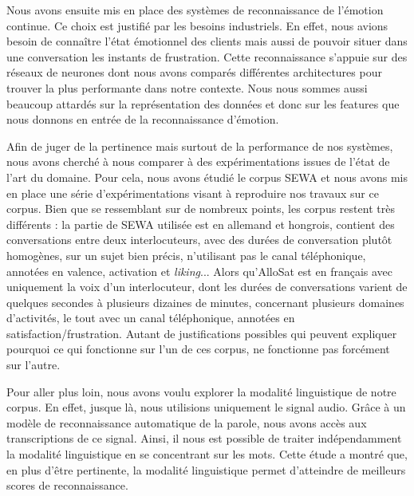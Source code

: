 Nous avons ensuite mis en place des systèmes de reconnaissance de l'émotion continue. Ce choix est justifié par les besoins industriels. En effet, nous avions besoin de connaître l'état émotionnel des clients mais aussi de pouvoir situer dans une conversation les instants de frustration. Cette reconnaissance s'appuie sur des réseaux de neurones dont nous avons comparés différentes architectures pour trouver la plus performante dans notre contexte. Nous nous sommes aussi beaucoup attardés sur la représentation des données et donc sur les features que nous donnons en entrée de la reconnaissance d'émotion.

Afin de juger de la pertinence mais surtout de la performance de nos systèmes, nous avons cherché à nous comparer à des expérimentations issues de l'état de l'art du domaine. Pour cela, nous avons étudié le corpus SEWA et nous avons mis en place une série d'expérimentations visant à reproduire nos travaux sur ce corpus. Bien que se ressemblant sur de nombreux points, les corpus restent très différents : la partie de SEWA utilisée est en allemand et hongrois, contient des conversations entre deux interlocuteurs, avec des durées de conversation plutôt homogènes, sur un sujet bien précis, n'utilisant pas le canal téléphonique, annotées en valence, activation et \textit{liking}... Alors qu'AlloSat est en français avec uniquement la voix d'un interlocuteur, dont les durées de conversations varient de quelques secondes à plusieurs dizaines de minutes, concernant plusieurs domaines d'activités, le tout avec un canal téléphonique, annotées en satisfaction/frustration. Autant de justifications possibles qui peuvent expliquer pourquoi ce qui fonctionne sur l'un de ces corpus, ne fonctionne pas forcément sur l'autre.

Pour aller plus loin, nous avons voulu explorer la modalité linguistique de notre corpus. En effet, jusque là, nous utilisions uniquement le signal audio. Grâce à un modèle de reconnaissance automatique de la parole, nous avons accès aux transcriptions de ce signal. Ainsi, il nous est possible de traiter indépendamment la modalité linguistique en se concentrant sur les mots. Cette étude a montré que, en plus d'être pertinente, la modalité linguistique permet d'atteindre de meilleurs scores de reconnaissance. %

